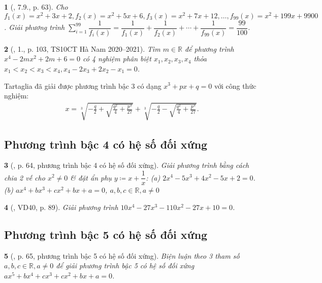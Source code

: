 \documentclass{article}
\newtheorem{baitoan}{}
\begin{document}
\begin{baitoan}[\cite{Binh_boi_duong_Toan_9_tap_2}, 7.9., p. 63]
	Cho $f_1(x) = x^2 + 3x + 2,f_2(x) = x^2 + 5x + 6,f_3(x) = x^2 + 7x + 12,\ldots,f_{99}(x) = x^2 + 199x + 9900$. Giải phương trình $\sum_{i=1}^{99} \dfrac{1}{f_i(x)} = \dfrac{1}{f_1(x)} + \dfrac{1}{f_2(x)} + \cdots + \dfrac{1}{f_{99}(x)} = \dfrac{99}{100}$.
\end{baitoan}

\begin{baitoan}[\cite{Lam_An_Tuan_Toan_9_dai_so}, 1., p. 103, TS10CT Hà Nam 2020--2021]
	Tìm $m\in\mathbb{R}$ để phương trình $x^4 - 2mx^2 + 2m + 6 = 0$ có 4 nghiệm phân biệt $x_1,x_2,x_3,x_4$ thỏa $x_1 < x_2 < x_3 < x_4,x_4 - 2x_3 + 2x_2 - x_1 = 0$.
\end{baitoan}
Tartaglia đã giải được phương trình bậc 3 có dạng $x^3 + px + q = 0$ với công thức nghiệm:
\begin{align*}
	x = \sqrt[3]{-\frac{q}{2} + \sqrt{\frac{q^2}{4} + \frac{p^3}{27}}} + \sqrt[3]{-\frac{q}{2} - \sqrt{\frac{q^2}{4} + \frac{p^3}{27}}}.
\end{align*}

\subsection{Phương trình bậc 4 có hệ số đối xứng}

\begin{baitoan}[\cite{Binh_boi_duong_Toan_9_tap_2}, p. 64, phương trình bậc 4 có hệ số đối xứng]
	Giải phương trình bằng cách chia 2 vế cho $x^2\ne0$ \& đặt ẩn phụ $y\coloneqq x + \dfrac{1}{x}$: (a) $2x^4 - 5x^3 + 4x^2 - 5x + 2 = 0$. (b) $ax^4 + bx^3 + cx^2 + bx + a = 0$, $a,b,c\in\mathbb{R},a\ne0$
\end{baitoan}

\begin{baitoan}[\cite{Tuyen_Toan_9_old}, VD40, p. 89]
	Giải phương trình $10x^4 - 27x^3 - 110x^2 - 27x + 10 = 0$.
\end{baitoan}

\subsection{Phương trình bậc 5 có hệ số đối xứng}

\begin{baitoan}[\cite{Binh_boi_duong_Toan_9_tap_2}, p. 65, phương trình bậc 5 có hệ số đối xứng]
	Biện luận theo 3 tham số $a,b,c\in\mathbb{R},a\ne0$ để giải phương trình bậc 5 có hệ số đối xứng $ax^5 + bx^4 + cx^3 + cx^2 + bx + a = 0$.
\end{baitoan}
\end{document}
